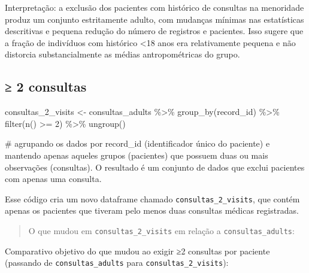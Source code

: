 \documentclass[
]{article}
\newenvironment{Shaded}{\begin{snugshade}}{\end{snugshade}}
\newcommand{\CommentTok}[1]{\textcolor[rgb]{0.37,0.37,0.37}{#1}}
\newcommand{\DecValTok}[1]{\textcolor[rgb]{0.68,0.00,0.00}{#1}}
\newcommand{\FunctionTok}[1]{\textcolor[rgb]{0.28,0.35,0.67}{#1}}
\newcommand{\NormalTok}[1]{\textcolor[rgb]{0.00,0.23,0.31}{#1}}
\newcommand{\OtherTok}[1]{\textcolor[rgb]{0.00,0.23,0.31}{#1}}
\newcommand{\SpecialCharTok}[1]{\textcolor[rgb]{0.37,0.37,0.37}{#1}}
\begin{document}
Interpretação: a exclusão dos pacientes com histórico de consultas na
menoridade produz um conjunto estritamente adulto, com mudanças mínimas
nas estatísticas descritivas e pequena redução do número de registros e
pacientes. Isso sugere que a fração de indivíduos com histórico
\textless18 anos era relativamente pequena e não distorcia
substancialmente as médias antropométricas do grupo.

\subsection{≥ 2 consultas}\label{consultas-1}

\begin{Shaded}
\begin{Highlighting}[]
\NormalTok{consultas\_2\_visits }\OtherTok{\textless{}{-}}\NormalTok{ consultas\_adults }\SpecialCharTok{\%\textgreater{}\%} 
  \FunctionTok{group\_by}\NormalTok{(record\_id) }\SpecialCharTok{\%\textgreater{}\%} 
  \FunctionTok{filter}\NormalTok{(}\FunctionTok{n}\NormalTok{() }\SpecialCharTok{\textgreater{}=} \DecValTok{2}\NormalTok{) }\SpecialCharTok{\%\textgreater{}\%} 
  \FunctionTok{ungroup}\NormalTok{()}

\CommentTok{\# agrupando os dados por \textasciigrave{}record\_id\textasciigrave{} (identificador único do paciente) e mantendo apenas aqueles grupos (pacientes) que possuem duas ou mais observações (consultas). O resultado é um conjunto de dados que exclui pacientes com apenas uma consulta.}
\end{Highlighting}
\end{Shaded}

Esse código cria um novo dataframe chamado
\texttt{consultas\_2\_visits}, que contém apenas os pacientes que
tiveram pelo menos duas consultas médicas registradas.

\begin{quote}
O que mudou em \texttt{consultas\_2\_visits} em relação a
\texttt{consultas\_adults}:
\end{quote}

Comparativo objetivo do que mudou ao exigir ≥2 consultas por paciente
(passando de \texttt{consultas\_adults} para
\texttt{consultas\_2\_visits}):
\end{document}
